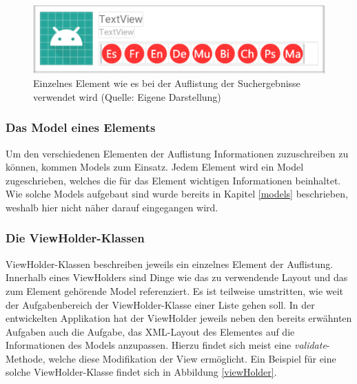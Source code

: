 \documentclass[../main.tex]{subfiles}
\begin{document}
	\begin{figure}
		\centering
		\includegraphics[width=\linewidth]{./images/Listelement.png}
		\caption{Einzelnes Element wie es bei der Auflistung der Suchergebnisse verwendet wird (Quelle: Eigene Darstellung)}
		\label{listElement}
	\end{figure}

	\subsubsection{Das Model eines Elements}
	Um den verschiedenen Elementen der Auflistung Informationen zuzuschreiben zu können, kommen Models zum Einsatz. Jedem Element wird ein Model zugeschrieben, welches die für das Element wichtigen Informationen beinhaltet. Wie solche Models aufgebaut sind wurde bereits in Kapitel \ref{models} beschrieben, weshalb hier nicht näher darauf eingegangen wird.
	
	\subsubsection{Die ViewHolder-Klassen}
	ViewHolder-Klassen beschreiben jeweils ein einzelnes Element der Auflistung. Innerhalb eines ViewHolders sind Dinge wie das zu verwendende Layout und das zum Element gehörende Model referenziert. Es ist teilweise umstritten, wie weit der Aufgabenbereich der ViewHolder-Klasse einer Liste gehen soll. In der entwickelten Applikation hat der ViewHolder jeweils neben den bereits erwähnten Aufgaben auch die Aufgabe, das XML-Layout des Elementes auf die Informationen des Models anzupassen. Hierzu findet sich meist eine \emph{validate}-Methode, welche diese Modifikation der View ermöglicht. Ein Beispiel für eine solche ViewHolder-Klasse findet sich in Abbildung \ref{viewHolder}.
\end{document}
